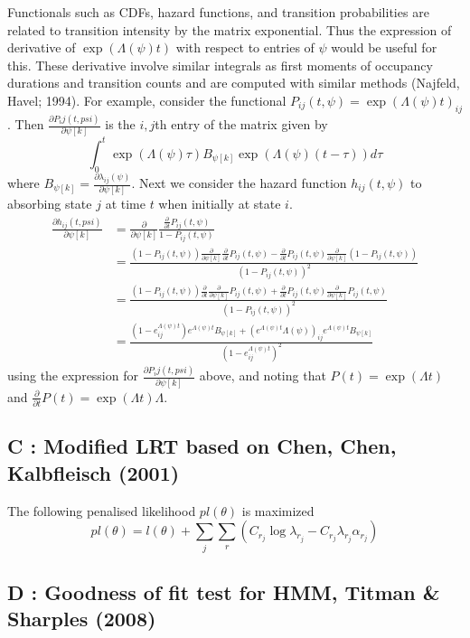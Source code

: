 \documentclass{uwstat572}
\begin{document}
Functionals such as CDFs, hazard functions, and transition probabilities are related to transition intensity by the matrix exponential. Thus the expression of derivative of $\exp(\Lambda(\psi)t)$ with respect to entries of $\psi$ would be useful for this. These derivative involve similar integrals as first moments of occupancy durations and transition counts and are computed with similar methods (Najfeld, Havel; 1994). For example, consider the functional $P_{ij}(t,\psi) = \exp (\Lambda(\psi)t)_{ij}$. Then $\frac{\partial P_ij(t,psi)}{\partial \psi [k]}$ is the $i,j$th entry of the matrix given by \[\int_{0}^t \exp (\Lambda (\psi) \tau) B_{\psi [k]} \exp (\Lambda (\psi) (t-\tau)) d \tau\] 
where $B_{\psi [k]} = \frac{\partial \lambda_{ij} (\psi)}{\partial \psi [k]}$. Next we consider the hazard function $h_{ij}(t,\psi)$ to absorbing state $j$  at time $t$ when initially at state $i$. \begin{align*}
\frac{\partial h_{ij}(t,psi)}{\partial \psi [k]} &= \frac{\partial}{\partial \psi [k]} \frac{\frac{\partial}{\partial t}P_{ij}(t,\psi)}{1-P_{ij}(t,\psi)}\\
& =\frac{(1-P_{ij}(t,\psi))\frac{\partial}{\partial \psi [k]} \frac{\partial}{\partial t}P_{ij}(t,\psi)- \frac{\partial}{\partial t}P_{ij}(t,\psi)\frac{\partial}{\partial \psi [k]} (1-P_{ij}(t,\psi))}{(1-P_{ij}(t,\psi))^2}\\
& =\frac{(1-P_{ij}(t,\psi)) \frac{\partial}{\partial t}\frac{\partial}{\partial \psi [k]}P_{ij}(t,\psi) + \frac{\partial}{\partial t}P_{ij}(t,\psi)\frac{\partial}{\partial \psi [k]} P_{ij}(t,\psi)}{(1-P_{ij}(t,\psi))^2}\\
&= \frac{(1-e^{\Lambda (\psi) t}_{ij}) e^{\Lambda (\psi) t} B_{\psi [k]} + (e^{\Lambda (\psi) t} \Lambda (\psi) )_{ij} e^{\Lambda (\psi) t} B_{\psi [k]}}{(1-e^{\Lambda (\psi) t}_{ij})^2}
\end{align*}
using the expression for $\frac{\partial P_ij(t,psi)}{\partial \psi [k]}$ above, and noting that $P(t)= \exp(\Lambda t)$ and $\frac{\partial}{\partial t} P(t) = \exp(\Lambda t) \Lambda$.
\subsection*{C : Modified LRT based on Chen, Chen, Kalbfleisch (2001)}
The following penalised likelihood $pl(\theta)$ is maximized
\[
pl(\theta) = l(\theta) + \sum_{j}\sum_{r} (C_{r_j} \log \lambda_{r_j} - C_{r_j} \lambda_{r_j} \alpha_{r_j})
\]
\subsection*{D : Goodness of fit test for HMM, Titman \& Sharples (2008)}
\end{document}
